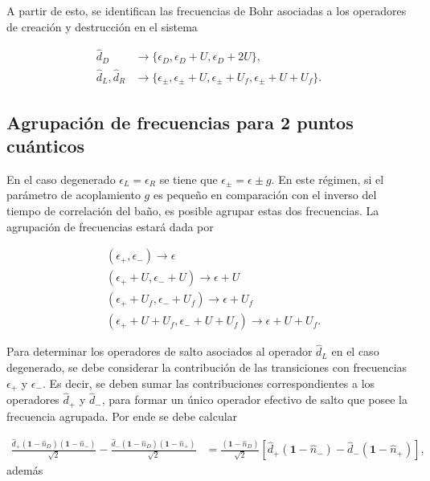 \begin{appendixs}
A partir de esto, se identifican las frecuencias de Bohr asociadas a los operadores de creación y destrucción en el sistema

\begin{align*}
    \hat{d}_{D} & \rightarrow \{\epsilon_{D}, \epsilon_{D}+U, \epsilon_{D}+2U\}, \\
    \hat{d}_{L}, \hat{d}_{R} & \rightarrow \{\epsilon_{\pm}, \epsilon_{\pm}+U, \epsilon_{\pm}+U_{f}, \epsilon_{\pm}+U+U_{f}\}.
\end{align*}



\label{apendix5jumpop}

\subsection{Agrupación de frecuencias para 2 puntos cuánticos}
En el caso degenerado $\epsilon_{L} = \epsilon_{R}$ se tiene que $\epsilon_{\pm} = \epsilon \pm g$. En este régimen, si el parámetro de acoplamiento $g$ es pequeño en comparación con el inverso del tiempo de correlación del baño, es posible agrupar estas dos frecuencias. La agrupación de frecuencias estará dada por 

\begin{align*}
    &(\epsilon_{+},\epsilon_{-})  \to \epsilon \\
    &(\epsilon_{+}+U,\epsilon_{-}+U)  \to \epsilon+U \\
    &(\epsilon_{+}+U_{f},\epsilon_{-}+U_{f})  \to \epsilon+U_{f} \\
    &(\epsilon_{+}+U+U_{f},\epsilon_{-}+U+U_{f})  \to \epsilon+U+U_{f}.
\end{align*}

Para determinar los operadores de salto asociados al operador $\hat{d}_{L}$ en el caso degenerado, se debe considerar la contribución de las transiciones con frecuencias $\epsilon_{+}$ y $\epsilon_{-}$. Es decir, se deben sumar las contribuciones correspondientes a los operadores $\hat{d}_{+}$ y $\hat{d}_{-}$, para formar un único operador efectivo de salto que posee la frecuencia agrupada. Por ende se debe calcular 

\begin{align*}
    \frac{\hat{d}_{+}(\textbf{1}-\hat{n}_{D})(\textbf{1}-\hat{n}_{-})}{\sqrt{2}} - \frac{\hat{d}_{-}(\textbf{1}-\hat{n}_{D})(\textbf{1}-\hat{n}_{+})}{\sqrt{2}} & = \frac{(\textbf{1}-\hat{n}_{D})}{\sqrt{2}} [\hat{d}_{+}(\textbf{1}-\hat{n}_{-}) - \hat{d}_{-}(\textbf{1}-\hat{n}_{+}) ],
\end{align*}
además 


\end{appendixs}
